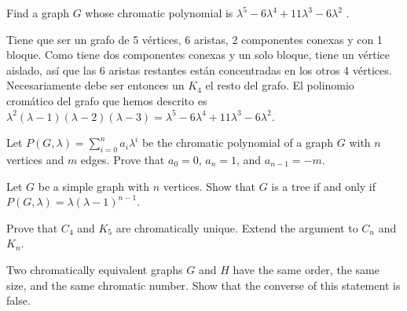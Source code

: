 \documentclass[twoside]{article}
\begin{document}
\begin{ejercicio}{3.8}
Find a graph $G$ whose chromatic polynomial is $λ^5 − 6λ^4 + 11λ^3 − 6λ^2$
.
\end{ejercicio}
\begin{solucion}
Tiene que ser un grafo de 5 vértices, 6 aristas, 2 componentes conexas y con 1 bloque. Como tiene dos componentes conexas y un solo bloque, tiene un vértice aislado, así que las 6 aristas restantes están concentradas en los otros 4 vértices. Necesariamente debe ser entonces un $K_4$ el resto del grafo. El polinomio cromático del grafo que hemos descrito es $\lambda^2(\lambda-1)(\lambda-2)(\lambda-3)=λ^5 − 6λ^4 + 11λ^3 − 6λ^2$.



\end{solucion}
\newpage

\begin{ejercicio}{3.9}
Let $P(G, λ) = \sum^n_{i=0} a_iλ^i$ be the chromatic polynomial of a graph $G$ with $n$ vertices and
$m$ edges. Prove that $a_0 = 0$, $a_n = 1$, and $a_{n−1} = −m$.
\end{ejercicio}
\begin{solucion}

\end{solucion}

\newpage

\begin{ejercicio}{3.10}
Let $G$ be a simple graph with $n$ vertices. Show that $G$ is a tree if and only if $P(G, λ) =
λ(λ − 1)^{n−1}$.

\end{ejercicio}
\begin{solucion}
\end{solucion}

\newpage

\begin{ejercicio}{3.11}
 Prove that $C_4$ and $K_5$ are chromatically unique. Extend the argument to $C_n$ and $K_n$.
\end{ejercicio}
\begin{solucion}
\end{solucion}

\newpage

\begin{ejercicio}{3.12}
Two chromatically equivalent graphs $G$ and $H$ have the same order, the same size, and
the same chromatic number. Show that the converse of this statement is false.
\end{ejercicio}
\begin{solucion}
\end{solucion}
\end{document}
